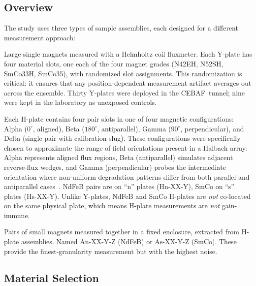\documentclass[11pt,letterpaper]{article}
\newcommand{\CEBAF}{CEBAF}
\begin{document}
\subsection{Overview}

The study uses three types of sample assemblies, each designed for a different
measurement approach:

\begin{description}[style=nextline]
    \item[Y-plates (primary measurement)]
    Large single magnets measured with a Helmholtz coil fluxmeter. Each Y-plate
    has four material slots, one each of the four magnet grades (N42EH, N52SH,
    SmCo33H, SmCo35), with randomized slot assignments. This
    randomization is critical: it ensures that any position-dependent
    measurement artifact averages out across the ensemble. Thirty Y-plates were
    deployed in the \CEBAF~tunnel; nine were kept in the laboratory as
    unexposed controls.

    \item[H-plates (pair assemblies)]
    Each H-plate contains four pair slots in one of four magnetic
    configurations: Alpha ($0^\circ$, aligned), Beta ($180^\circ$,
    antiparallel), Gamma ($90^\circ$, perpendicular), and Delta
    (single pair with calibration slug). These configurations were specifically
    chosen to approximate the range of field orientations present in a Halbach
    array: Alpha represents aligned flux regions, Beta (antiparallel) simulates
    adjacent reverse-flux wedges, and Gamma (perpendicular) probes the
    intermediate orientation where non-uniform degradation patterns differ from
    both parallel and antiparallel cases~\cite{NGotta2024,Brooks2017}.
    NdFeB pairs are on ``n'' plates (Hn-XX-Y), SmCo on ``s'' plates
    (Hs-XX-Y). Unlike Y-plates, NdFeB and SmCo H-plates are \emph{not}
    co-located on the same physical plate, which means H-plate measurements
    are \emph{not} gain-immune.

    \item[A-samples (individual magnets)]
    Pairs of small magnets measured together in a fixed enclosure, extracted
    from H-plate assemblies. Named An-XX-Y-Z (NdFeB) or As-XX-Y-Z (SmCo).
    These provide the finest-granularity measurement but with the highest
    noise.
\end{description}

\subsection{Material Selection}
\label{sec:materials}
\end{document}

